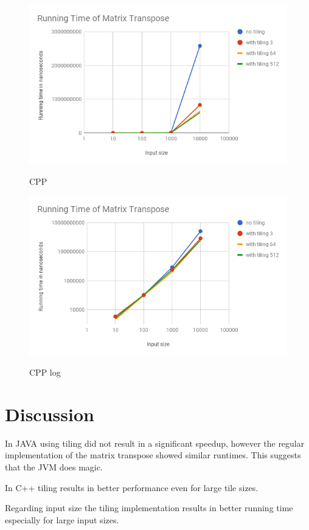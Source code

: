 \documentclass[
    12pt,
    a4paper,
    oneside, 
    headinclude,footinclude,
    BCOR5mm,
]{scrartcl}
\begin{document}
\begin{figure}
\includegraphics[scale=0.5]{figures/CPPdifInput.png}
\label{fig:CPP}
\caption{CPP}

\end{figure}

\begin{figure}
\includegraphics[scale=0.5]{figures/CPPdifInputlog.png}
\label{fig:CPPlog}
\caption{CPP log}

\end{figure}


\section*{Discussion}
In JAVA using tiling did not result in a significant speedup, however the regular implementation of the matrix transpose showed similar runtimes. 
This suggests that the JVM does magic.

In C++ tiling results in better performance even for large tile sizes.

Regarding input size the tiling implementation results in better running time especially for large input sizes.
\end{document}
